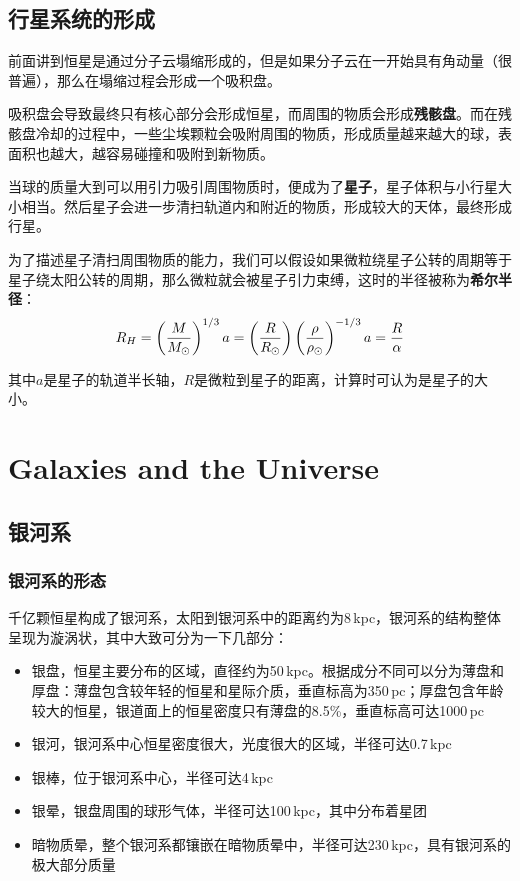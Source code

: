 \documentclass[openany]{ctexbook}
\begin{document}
\chapter{行星系统的形成}
前面讲到恒星是通过分子云塌缩形成的，但是如果分子云在一开始具有角动量（很普遍），那么在塌缩过程会形成一个吸积盘。

吸积盘会导致最终只有核心部分会形成恒星，而周围的物质会形成\textbf{残骸盘}。而在残骸盘冷却的过程中，一些尘埃颗粒会吸附周围的物质，形成质量越来越大的球，表面积也越大，越容易碰撞和吸附到新物质。

当球的质量大到可以用引力吸引周围物质时，便成为了\textbf{星子}，星子体积与小行星大小相当。然后星子会进一步清扫轨道内和附近的物质，形成较大的天体，最终形成行星。

为了描述星子清扫周围物质的能力，我们可以假设如果微粒绕星子公转的周期等于星子绕太阳公转的周期，那么微粒就会被星子引力束缚，这时的半径被称为\textbf{希尔半径}：
\begin{equation}
  R_H=\left({M\over M_\odot}\right)^{1/3}a=\left({R\over R_\odot}\right)\left({\rho \over \rho_\odot}\right)^{-1/3}a={R\over \alpha}
\end{equation}

其中$a$是星子的轨道半长轴，$R$是微粒到星子的距离，计算时可认为是星子的大小。

\part{Galaxies and the Universe}
\chapter{银河系}
\section{银河系的形态}
千亿颗恒星构成了银河系，太阳到银河系中的距离约为8\,kpc，银河系的结构整体呈现为漩涡状，其中大致可分为一下几部分：
\begin{itemize}
  \item 银盘，恒星主要分布的区域，直径约为50\,kpc。根据成分不同可以分为薄盘和厚盘：薄盘包含较年轻的恒星和星际介质，垂直标高为350\,pc；厚盘包含年龄较大的恒星，银道面上的恒星密度只有薄盘的8.5\%，垂直标高可达1000\,pc
  \item 银河，银河系中心恒星密度很大，光度很大的区域，半径可达0.7\,kpc
  \item 银棒，位于银河系中心，半径可达4\,kpc
  \item 银晕，银盘周围的球形气体，半径可达100\,kpc，其中分布着星团
  \item 暗物质晕，整个银河系都镶嵌在暗物质晕中，半径可达230\,kpc，具有银河系的极大部分质量
\end{itemize}
\end{document}
